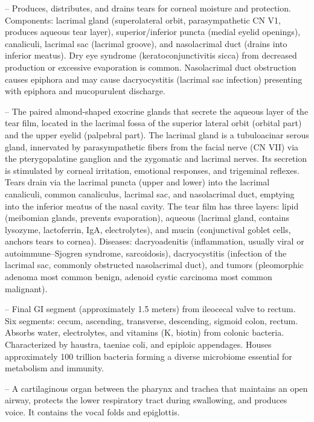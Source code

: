 -- Produces, distributes, and drains tears for corneal moisture and protection. Components: lacrimal gland (superolateral orbit, parasympathetic CN V1, produces aqueous tear layer), superior/inferior puncta (medial eyelid openings), canaliculi, lacrimal sac (lacrimal groove), and nasolacrimal duct (drains into inferior meatus). Dry eye syndrome (keratoconjunctivitis sicca) from decreased production or excessive evaporation is common. Nasolacrimal duct obstruction causes epiphora and may cause dacryocystitis (lacrimal sac infection) presenting with epiphora and mucopurulent discharge.

-- The paired almond-shaped exocrine glands that secrete the aqueous layer of the tear film, located in the lacrimal fossa of the superior lateral orbit (orbital part) and the upper eyelid (palpebral part). The lacrimal gland is a tubuloacinar serous gland, innervated by parasympathetic fibers from the facial nerve (CN VII) via the pterygopalatine ganglion and the zygomatic and lacrimal nerves. Its secretion is stimulated by corneal irritation, emotional responses, and trigeminal reflexes. Tears drain via the lacrimal puncta (upper and lower) into the lacrimal canaliculi, common canaliculus, lacrimal sac, and nasolacrimal duct, emptying into the inferior meatus of the nasal cavity. The tear film has three layers: lipid (meibomian glands, prevents evaporation), aqueous (lacrimal gland, contains lysozyme, lactoferrin, IgA, electrolytes), and mucin (conjunctival goblet cells, anchors tears to cornea). Diseases: dacryoadenitis (inflammation, usually viral or autoimmune--Sjogren syndrome, sarcoidosis), dacryocystitis (infection of the lacrimal sac, commonly obstructed nasolacrimal duct), and tumors (pleomorphic adenoma most common benign, adenoid cystic carcinoma most common malignant).

-- Final GI segment (approximately 1.5 meters) from ileocecal valve to rectum. Six segments: cecum, ascending, transverse, descending, sigmoid colon, rectum. Absorbs water, electrolytes, and vitamins (K, biotin) from colonic bacteria. Characterized by haustra, taeniae coli, and epiploic appendages. Houses approximately 100 trillion bacteria forming a diverse microbiome essential for metabolism and immunity.

-- A cartilaginous organ between the pharynx and trachea that maintains an open airway, protects the lower respiratory tract during swallowing, and produces voice. It contains the vocal folds and epiglottis.

